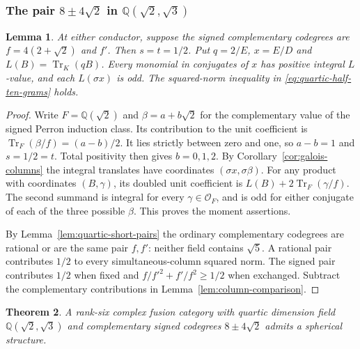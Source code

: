 \documentclass[11pt,reqno]{amsart}
\newtheorem{theorem}{Theorem}[section]
\newtheorem{lemma}[theorem]{Lemma}
\theoremstyle{remark}\newtheorem{remark}[theorem]{Remark}
\numberwithin{equation}{section}
\begin{document}
\subsubsection{\texorpdfstring{The pair $8\pm4\sqrt2$ in $\mathbb Q(\sqrt2,\sqrt3)$}{The conjugate pair at conductor twenty-four}}
\begin{lemma}\label{prop:quartic-twenty-four-fold}
At either conductor, suppose the signed complementary codegrees are
$f=4(2+\sqrt2)$ and $f'$. Then $s=t=1/2$. Put $q=2/E$, $x=E/D$ and
$L(B)=\operatorname{Tr}_K(qB)$. Every monomial in conjugates of $x$
has positive integral $L$-value, and each $L(\sigma x)$ is odd.
The squared-norm inequality in \eqref{eq:quartic-half-ten-grams} holds.
\end{lemma}
\begin{proof}
Write $F=\mathbb Q(\sqrt2)$ and $\beta=a+b\sqrt2$ for the
complementary value of the signed Perron induction class. Its
contribution to the unit coefficient is
$\operatorname{Tr}_F(\beta/f)=(a-b)/2$. It lies strictly between
zero and one, so $a-b=1$ and $s=1/2=t$. Total positivity then gives
$b=0,1,2$. By Corollary~\ref{cor:galois-columns} the integral
translates have coordinates $(\sigma x,\sigma\beta)$. For any
product with coordinates $(B,\gamma)$, its doubled unit coefficient
is $L(B)+2\operatorname{Tr}_F(\gamma/f)$. The second summand is
integral for every $\gamma\in\mathcal O_F$, and is odd for either
conjugate of each of the three possible $\beta$. This proves the
moment assertions.

By Lemma~\ref{lem:quartic-short-pairs} the ordinary complementary
codegrees are rational or are the same pair $f,f'$: neither field
contains $\sqrt5$. A rational pair contributes $1/2$ to every
simultaneous-column squared norm. The signed pair contributes $1/2$
when fixed and $f/f'^2+f'/f^2\ge1/2$ when exchanged. Subtract the
complementary contributions in Lemma~\ref{lem:column-comparison}.
\end{proof}
\begin{theorem}\label{thm:quartic-twenty-four-silver}
A rank-six complex fusion category with quartic dimension field
$\mathbb Q(\sqrt2,\sqrt3)$ and complementary signed codegrees
$8\pm4\sqrt2$ admits a spherical structure.
\end{theorem}
\end{document}
